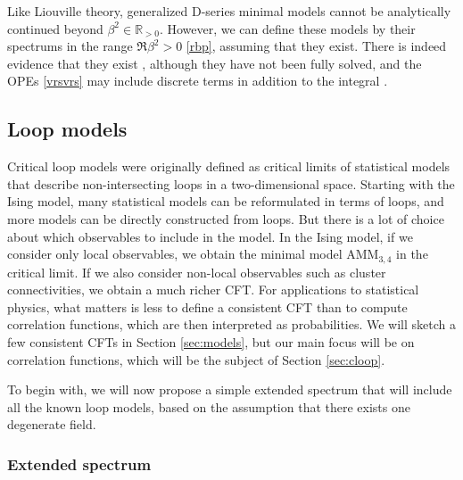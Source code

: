 \documentclass[12pt, a4paper]{article}
\theoremstyle{break}
\begin{document}
Like Liouville theory, generalized D-series minimal models cannot be analytically continued beyond $\beta^2\in \mathbb{R}_{>0}$. However, we can define these models by their spectrums in the range $\Re\beta^2>0$ \eqref{rbp}, assuming that they exist. There is indeed evidence that they exist \cite{mr17}, although they have not been fully solved, and the OPEs \eqref{vrsvrs} may include discrete terms in addition to the integral \cite{rib19}. 


\subsection{Loop models}

Critical loop models were originally defined as critical limits of statistical models that describe non-intersecting loops in a two-dimensional space. Starting with the Ising model, many statistical models can be reformulated in terms of loops, and more models can be directly constructed from loops. But there is a lot of choice about which observables to include in the model. In the Ising model, if we consider only local observables, we obtain the minimal model $\text{AMM}_{3,4}$ in the critical limit. If we also consider non-local observables such as cluster connectivities, we obtain a much richer CFT. For applications to statistical physics, what matters is less to define a consistent CFT than to compute correlation functions, which are then interpreted as probabilities. We will sketch a few consistent CFTs in Section \ref{sec:models}, but our main focus will be on correlation functions, which will be the subject of Section \ref{sec:cloop}.

To begin with, we will now propose a simple extended spectrum that will include all the known loop models, based on the assumption that there exists one degenerate field. 

\subsubsection{Extended spectrum}
\end{document}
